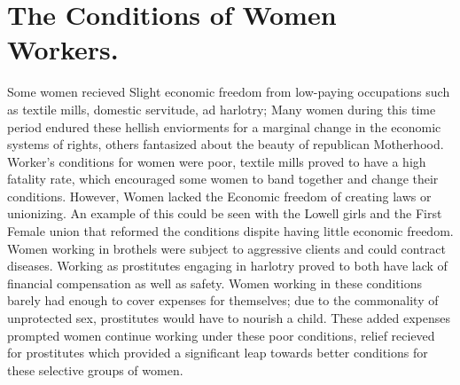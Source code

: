 \documentclass{article}
\begin{document}
\section{The Conditions of Women Workers.}
Some women recieved Slight economic freedom from low-paying occupations such as textile mills, domestic servitude, ad harlotry; Many women during this time period endured these hellish enviorments for a marginal change in the economic systems of rights, others fantasized about the beauty of republican Motherhood. Worker's conditions for women were poor, textile mills proved to have a high fatality rate, which encouraged some women to band together and change their conditions. However, Women lacked the Economic freedom of creating laws or unionizing. An example of this could be seen with the Lowell girls and the First Female union that reformed the conditions dispite having little economic freedom. Women working in brothels were subject to aggressive clients and could contract diseases. Working as prostitutes engaging in harlotry proved to both have lack of financial compensation as well as safety. Women working in these conditions barely had enough to cover expenses for themselves; due to the commonality of unprotected sex, prostitutes would have to nourish a child. These added expenses prompted women continue working under these poor conditions, relief recieved for prostitutes which provided a significant leap towards better conditions for these selective groups of women.
\end{document}
